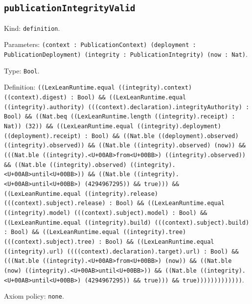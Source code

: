 \documentclass[11pt]{article}
\begin{document}
\subsection*{\texttt{publicationIntegrityValid}}
\noindent Kind: \texttt{definition}.\par
\noindent Parameters: \texttt{(context : PublicationContext) (deployment : PublicationDeployment) (integrity : PublicationIntegrity) (now : Nat)}.\par
\noindent Type: \texttt{Bool}.\par
\noindent Definition: \texttt{((LexLeanRuntime.equal ((integrity).context) ((context).digest) : Bool) \&\& ((LexLeanRuntime.equal ((integrity).authority) (((context).declaration).integrityAuthority) : Bool) \&\& ((Nat.beq ((LexLeanRuntime.length ((integrity).receipt) : Nat)) (32)) \&\& ((LexLeanRuntime.equal ((integrity).deployment) ((deployment).receipt) : Bool) \&\& ((Nat.ble ((deployment).observed) ((integrity).observed)) \&\& ((Nat.ble ((integrity).observed) (now)) \&\& (((Nat.ble ((integrity).<U+00AB>from<U+00BB>) ((integrity).observed)) \&\& ((Nat.ble ((integrity).observed) ((integrity).<U+00AB>until<U+00BB>)) \&\& ((Nat.ble ((integrity).<U+00AB>until<U+00BB>) (4294967295)) \&\& true))) \&\& ((LexLeanRuntime.equal ((integrity).release) (((context).subject).release) : Bool) \&\& ((LexLeanRuntime.equal ((integrity).model) (((context).subject).model) : Bool) \&\& ((LexLeanRuntime.equal ((integrity).build) (((context).subject).build) : Bool) \&\& ((LexLeanRuntime.equal ((integrity).tree) (((context).subject).tree) : Bool) \&\& ((LexLeanRuntime.equal ((integrity).url) ((((context).declaration).target).url) : Bool) \&\& (((Nat.ble ((integrity).<U+00AB>from<U+00BB>) (now)) \&\& ((Nat.ble (now) ((integrity).<U+00AB>until<U+00BB>)) \&\& ((Nat.ble ((integrity).<U+00AB>until<U+00BB>) (4294967295)) \&\& true))) \&\& true)))))))))))))}.\par
\noindent Axiom policy: \texttt{none}.\par
\end{document}
